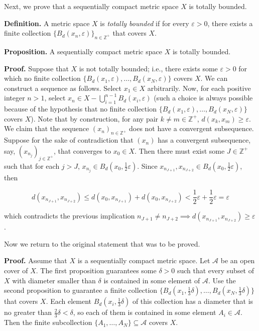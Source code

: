 \documentclass[12pt]{article}
\begin{document}
Next, we prove that a sequentially compact metric space $X$ is totally bounded.

\textbf{Definition. } A metric space $X$ is \emph{totally bounded} if for every $\varepsilon > 0$, there exists a finite collection $\{ B_d (x_n, \varepsilon) \}_{n \in \mathbb{Z}^+}$ that covers $X$.

\textbf{Proposition. } A sequentially compact metric space $X$ is totally bounded.

\textbf{Proof. } Suppose that $X$ is not totally bounded; i.e., there exists some $\varepsilon > 0$ for which no finite collection $\{ B_d (x_1, \varepsilon), \dots, B_d (x_N, \varepsilon) \}$ covers $X$. We can construct a sequence as follows. Select $x_1 \in X$ arbitrarily. Now, for each positive integer $n > 1$, select $x_n \in X - \bigcup_{i = 1}^{n - 1} B_d (x_i, \varepsilon)$ (such a choice is always possible because of the hypothesis that no finite collection $\{ B_d (x_1, \varepsilon), \dots, B_d (x_N, \varepsilon) \}$ covers $X$). Note that by construction, for any pair $k \ne m \in \mathbb{Z}^+$, $d (x_k, x_m) \ge \varepsilon$. We claim that the sequence $(x_n)_{n \in \mathbb{Z}^+}$ does not have a convergent subsequence. Suppose for the sake of contradiction that $(x_n)$ has a convergent subsequence, say, $(x_{n_j})_{j \in \mathbb{Z}^+}$, that converges to $x_0 \in X$. Then there must exist some $J \in \mathbb{Z}^+$ such that for each $j > J$, $x_{n_j} \in B_d \left( x_0, \frac{1}{2} \varepsilon \right)$. Since $x_{n_{J + 1}}, x_{n_{J + 2}} \in B_d \left( x_0, \frac{1}{2} \varepsilon \right)$, then

$$d (x_{n_{J + 1}}, x_{n_{J + 2}}) \le d (x_0, x_{n_{J + 1}}) + d (x_0, x_{n_{J + 2}}) < \frac{1}{2} \varepsilon + \frac{1}{2} \varepsilon = \varepsilon$$

which contradicts the previous implication $n_{J + 1} \ne n_{J + 2} \implies d (x_{n_{J + 1}}, x_{n_{J + 2}}) \ge \varepsilon$.

Now we return to the original statement that was to be proved.

\textbf{Proof. } Assume that $X$ is a sequentially compact metric space. Let $\mathcal{A}$ be an open cover of $X$. The first proposition guarantees some $\delta > 0$ such that every subset of $X$ with diameter smaller than $\delta$ is contained in some element of $\mathcal{A}$. Use the second proposition to guarantee a finite collection $\{ B_d (x_1, \frac{1}{3} \delta), \dots, B_d (x_N, \frac{1}{3} \delta) \}$ that covers $X$. Each element $B_d (x_i, \frac{1}{3} \delta)$ of this collection has a diameter that is no greater than $\frac{2}{3} \delta < \delta$, so each of them is contained in some element $A_i \in \mathcal{A}$. Then the finite subcollection $\{ A_1, \dots, A_N \} \subseteq \mathcal{A}$ covers $X$.
\end{document}
